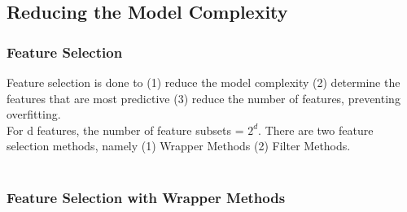\documentclass[12pt,a4paper,titlepage,landscape]{book}
\begin{document}
	\subsection{Reducing the Model Complexity}
	\subsubsection{Feature Selection}
	Feature selection is done to (1) reduce the model complexity (2) determine the features that are most predictive (3) reduce the number of features, preventing overfitting. \\
	For d features, the number of feature subsets = $2^d$.
	There are two feature selection methods, namely (1) Wrapper Methods (2) Filter Methods. \\
	\\
	\subsubsection{Feature Selection with Wrapper Methods}
\end{document}
